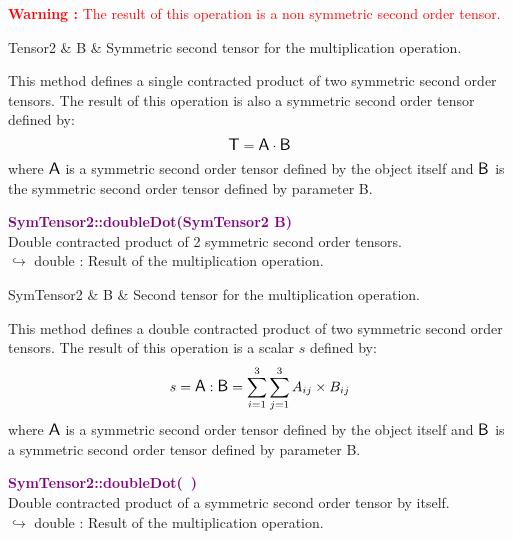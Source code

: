 \hspace*{10mm}\textcolor{red}{\textbf{Warning :}  The result of this operation is a non symmetric second order tensor.}

\begin{tcolorbox}[width=\textwidth,myArgs,tabularx={ll|R}]
Tensor2 & B & Symmetric second tensor for the multiplication operation.
\end{tcolorbox}

This method defines a single contracted product of two symmetric second order tensors.
The result of this operation is also a symmetric second order tensor defined by:
\begin{equation*}
\mbox{\large\ensuremath{\mathsf{T}}} = \mbox{\large\ensuremath{\mathsf{A}}} \cdot \mbox{\large\ensuremath{\mathsf{B}}}
\end{equation*}
where $\mbox{\large\ensuremath{\mathsf{A}}}$ is a symmetric second order tensor defined by the object itself and $\mbox{\large\ensuremath{\mathsf{B}}}$ is the symmetric second order tensor defined by parameter B.

\textcolor{purple}{\textbf{SymTensor2::doubleDot(SymTensor2 B)}}\label{SymTensor2::doubleDot(SymTensor2 B)}\\
Double contracted product of 2 symmetric second order tensors.\\ \hspace*{10mm}$\hookrightarrow$ double : Result of the multiplication operation.

\begin{tcolorbox}[width=\textwidth,myArgs,tabularx={ll|R}]
SymTensor2 & B & Second tensor for the multiplication operation.
\end{tcolorbox}

This method defines a double contracted product of two symmetric second order tensors.
The result of this operation is a scalar $s$ defined by:
\begin{equation*}
s = \mbox{\large\ensuremath{\mathsf{A}}} : \mbox{\large\ensuremath{\mathsf{B}}} = \sum_{i=1}^{3} \sum_{j=1}^{3} A_{ij}\times B_{ij}
\end{equation*}
where $\mbox{\large\ensuremath{\mathsf{A}}}$ is a symmetric second order tensor defined by the object itself and $\mbox{\large\ensuremath{\mathsf{B}}}$ is a symmetric second order tensor defined by parameter B.

\textcolor{purple}{\textbf{SymTensor2::doubleDot(~)}}\label{SymTensor2::doubleDot()}\\
Double contracted product of a symmetric second order tensor by itself.\\ \hspace*{10mm}$\hookrightarrow$ double : Result of the multiplication operation.

